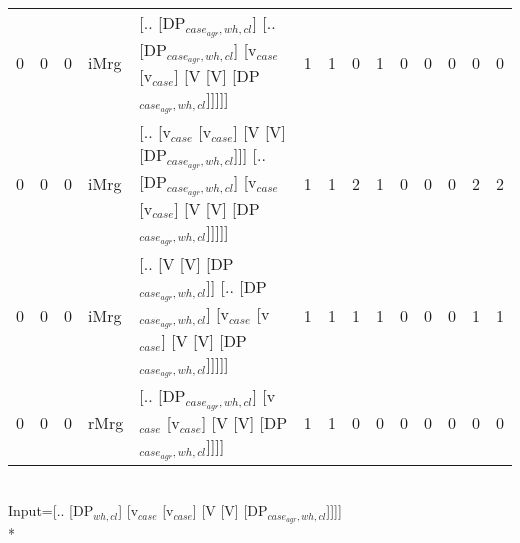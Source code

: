 \begin{tabularx}{\linewidth}{rrrlXrrrrrrrrr}
   0 &       0 &   0 & iMrg & [.. [DP$_{case_{agr},wh,cl}$] [.. [DP$_{case_{agr},wh,cl}$] [v$_{case}$ [v$_{case}$] [V [V] [DP$_{case_{agr},wh,cl}$]]]]]                           &             1 &             1 &                  0 &            1 &              0 &                0 &             0 &        0 &        0 \\
   0 &       0 &   0 & iMrg & [.. [v$_{case}$ [v$_{case}$] [V [V] [DP$_{case_{agr},wh,cl}$]]] [.. [DP$_{case_{agr},wh,cl}$] [v$_{case}$ [v$_{case}$] [V [V] [DP$_{case_{agr},wh,cl}$]]]]] &             1 &             1 &                  2 &            1 &              0 &                0 &             0 &        2 &        2 \\
   0 &       0 &   0 & iMrg & [.. [V [V] [DP$_{case_{agr},wh,cl}$]] [.. [DP$_{case_{agr},wh,cl}$] [v$_{case}$ [v$_{case}$] [V [V] [DP$_{case_{agr},wh,cl}$]]]]]                   &             1 &             1 &                  1 &            1 &              0 &                0 &             0 &        1 &        1 \\
   0 &       0 &   0 & rMrg & [.. [DP$_{case_{agr},wh,cl}$] [v$_{case}$ [v$_{case}$] [V [V] [DP$_{case_{agr},wh,cl}$]]]]                                                    &             1 &             1 &                  0 &            0 &              0 &                0 &             0 &        0 &        0 \\
\hline
\end{tabularx}\endgroup\\
\begingroup\scriptsize Input=[.. [DP$_{wh,cl}$] [v$_{case}$ [v$_{case}$] [V [V] [DP$_{case_{agr},wh,cl}$]]]]\\*
